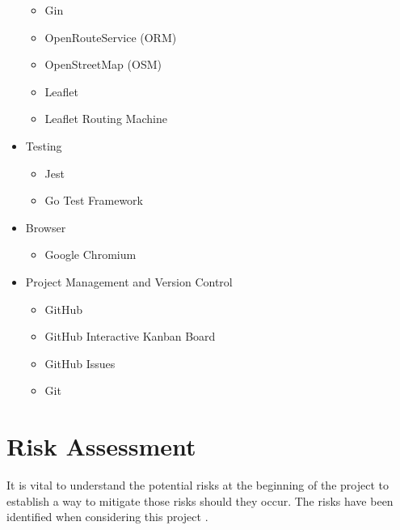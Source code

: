 \begin{itemize}
\begin{itemize}
        \item Gin
        \item OpenRouteService (ORM)
        \item OpenStreetMap (OSM)
        \item Leaflet
        \item Leaflet Routing Machine
    \end{itemize}
    \item Testing
    \begin{itemize}
        \item Jest
        \item Go Test Framework
    \end{itemize}
    \item Browser
    \begin{itemize}
        \item Google Chromium
    \end{itemize}
    \item Project Management and Version Control
    \begin{itemize}
        \item GitHub
        \item GitHub Interactive Kanban Board
        \item GitHub Issues
        \item Git
    \end{itemize}
\end{itemize}

\section{Risk Assessment}
\label{intro:riskassessment}

It is vital to understand the potential risks at the beginning of the project to establish a way to mitigate those risks should they occur. The risks have been identified when considering this project .


